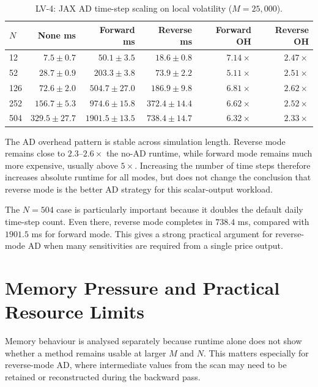 \begin{table}[htbp]
\centering
\small
\caption{LV-4: JAX AD time-step scaling on local volatility (\(M=25{,}000\)).}
\label{tab:lv4-ad-n-scaling}
\begin{tabular}{lrrrrr}
\toprule
\textbf{\(N\)}
& \textbf{None ms}
& \textbf{Forward ms}
& \textbf{Reverse ms}
& \textbf{Forward OH}
& \textbf{Reverse OH} \\
\midrule
12
& \(7.5\pm0.7\)
& \(50.1\pm 3.5\)
& \(18.6\pm0.8\)
& \(7.14\times\)
& \(2.47\times\) \\
52
& \(28.7\pm0.9\)
& \(203.3\pm 3.8\)
& \(73.9\pm2.2\)
& \(5.11\times\)
& \(2.51\times\) \\
126
& \(72.6\pm2.0\)
& \(504.7\pm27.0\)
& \(186.9\pm9.8\)
& \(6.81\times\)
& \(2.62\times\) \\
252
& \(156.7\pm5.3\)
& \(974.6\pm15.8\)
& \(372.4\pm14.4\)
& \(6.62\times\)
& \(2.52\times\) \\
504
& \(329.5\pm27.7\)
& \(1901.5\pm13.5\)
& \(738.4\pm14.7\)
& \(6.32\times\)
& \(2.33\times\) \\
\bottomrule
\end{tabular}
\end{table}

The AD overhead pattern is stable across simulation length.  Reverse mode
remains close to \(2.3\)--\(2.6\times\) the no-AD runtime, while forward
mode remains much more expensive, usually above \(5\times\).  Increasing the
number of time steps therefore increases absolute runtime for all modes, but
does not change the conclusion that reverse mode is the better AD strategy
for this scalar-output workload.

The \(N=504\) case is particularly important because it doubles the default
daily time-step count.  Even there, reverse mode completes in \(738.4\) ms,
compared with \(1901.5\) ms for forward mode.  This gives a strong practical
argument for reverse-mode AD when many sensitivities are required from a
single price output.

\section{Memory Pressure and Practical Resource Limits}
\label{sec:results-memory}

Memory behaviour is analysed separately because runtime alone does not show
whether a method remains usable at larger \(M\) and \(N\).  This matters
especially for reverse-mode AD, where intermediate values from the scan may
need to be retained or reconstructed during the backward pass.

